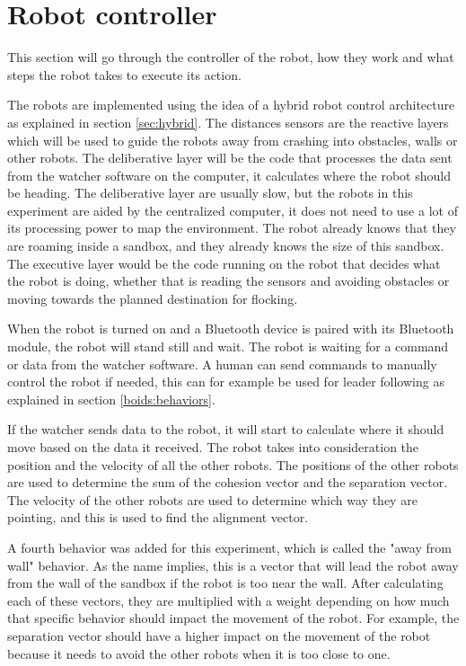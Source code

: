 \section{Robot controller}
This section will go through the controller of the robot, how they work and what steps the robot takes to execute its action.

The robots are implemented using the idea of a hybrid robot control architecture as explained in section \ref{sec:hybrid}. The distances sensors are the reactive layers which will be used to guide the robots away from crashing into obstacles, walls or other robots. The deliberative layer will be the code that processes the data sent from the watcher software on the computer, it calculates where the robot should be heading. The deliberative layer are usually slow, but the robots in this experiment are aided by the centralized computer, it does not need to use a lot of its processing power to map the environment. The robot already knows that they are roaming inside a sandbox, and they already knows the size of this sandbox.
The executive layer would be the code running on the robot that decides what the robot is doing, whether that is reading the sensors and avoiding obstacles or moving towards the planned destination for flocking.

When the robot is turned on and a Bluetooth device is paired with its Bluetooth module, the robot will stand still and wait. The robot is waiting for a command or data from the watcher software. A human can send commands to manually control the robot if needed, this can for example be used for leader following as explained in section \ref{boids:behaviors}. 

If the watcher sends data to the robot, it will start to calculate where it should move based on the data it received. 
The robot takes into consideration the position and the velocity of all the other robots. The positions of the other robots are used to determine the sum of the cohesion vector and the separation vector. The velocity of the other robots are used to determine which way they are pointing, and this is used to find the alignment vector.

A fourth behavior was added for this experiment, which is called the "away from wall" behavior. As the name implies, this is a vector that will lead the robot away from the wall of the sandbox if the robot is too near the wall. After calculating each of these vectors, they are multiplied with a weight depending on how much that specific behavior should impact the movement of the robot. For example, the separation vector should have a higher impact on the movement of the robot because it needs to avoid the other robots when it is too close to one. 

